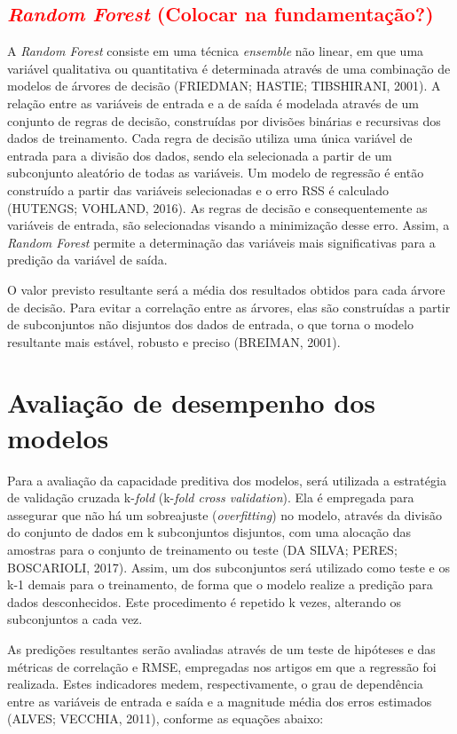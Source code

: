 \subsection{\textcolor{red}{\textit{Random Forest} (Colocar na fundamentação?)}}

A \textit{Random Forest} consiste em uma técnica \textit{ensemble} não linear, em que uma variável qualitativa ou quantitativa é determinada através de uma combinação de modelos de árvores de decisão (FRIEDMAN; HASTIE; TIBSHIRANI, 2001). A relação entre as variáveis de entrada e a de saída é modelada através de um conjunto de regras de decisão, construídas por divisões binárias e recursivas dos dados de treinamento. Cada regra de decisão utiliza uma única variável de entrada para a divisão dos dados, sendo ela selecionada a partir de um subconjunto aleatório de todas as variáveis. Um modelo de regressão é então construído a partir das variáveis selecionadas e o erro RSS é calculado (HUTENGS; VOHLAND, 2016). As regras de decisão e consequentemente as variáveis de entrada, são selecionadas visando a minimização desse erro. Assim, a \textit{Random Forest} permite a determinação das variáveis mais significativas para a predição da variável de saída. 

O valor previsto resultante será a média dos resultados obtidos para cada árvore de decisão. Para evitar a correlação entre as árvores, elas são construídas a partir de subconjuntos não disjuntos dos dados de entrada, o que torna o modelo resultante mais estável, robusto e preciso (BREIMAN, 2001). 

\section{Avaliação de desempenho dos modelos}

Para a avaliação da capacidade preditiva dos modelos, será utilizada a estratégia de validação cruzada k-\textit{fold} (k-\textit{fold cross validation}). Ela é empregada para assegurar que não há um sobreajuste (\textit{overfitting}) no modelo, através da divisão do conjunto de dados em k subconjuntos disjuntos, com uma alocação das amostras para o conjunto de treinamento ou teste (DA SILVA; PERES; BOSCARIOLI, 2017). Assim, um dos subconjuntos será utilizado como teste e os k-1 demais para o treinamento, de forma que o modelo realize a predição para dados desconhecidos. Este procedimento é repetido k vezes, alterando os subconjuntos a cada vez.

As predições resultantes serão avaliadas através de um teste de hipóteses e das métricas de correlação e RMSE, empregadas nos artigos em que a regressão foi realizada. Estes indicadores medem, respectivamente, o grau de dependência entre as variáveis de entrada e saída e a magnitude média dos erros estimados (ALVES; VECCHIA, 2011), conforme as equações abaixo:

